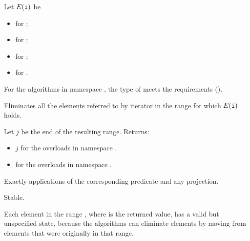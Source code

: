 \begin{itemdescr}
\pnum
Let $E(\tcode{i})$ be
\begin{itemize}
\item {} for ;
\item {} for ;
\item {} for ;
\item {} for .
\end{itemize}

\pnum
\expects
For the algorithms in namespace ,
the type of 
meets the  requirements ().

\pnum
\effects
Eliminates all the elements referred to by iterator 
in the range  for which $E(\tcode{i})$ holds.

\pnum
\returns
Let $j$ be the end of the resulting range. Returns:
\begin{itemize}
\item $j$ for the overloads in namespace .
\item {} for the overloads in namespace .
\end{itemize}

\pnum
\complexity
Exactly  applications
of the corresponding predicate and any projection.

\pnum
\remarks
Stable.

\pnum
\begin{note}
Each element in the range ,
where  is the returned value,
has a valid but unspecified state,
because the algorithms can eliminate elements
by moving from elements that were originally in that range.
\end{note}
\end{itemdescr}

